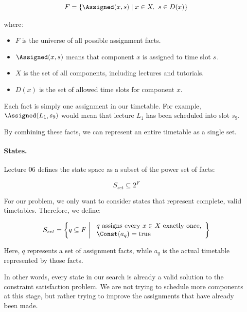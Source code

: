 \begin{equation}
    F=\{\Assigned(x,s)\mid x\in X,\ s\in D(x)\}
\end{equation}

where:
\begin{itemize}
    \item $F$ is the universe of all possible assignment facts.
    \item $\Assigned(x,s)$ means that component $x$ is assigned to time slot $s$.
    \item $X$ is the set of all components, including lectures and tutorials.
    \item $D(x)$ is the set of allowed time slots for component $x$.
\end{itemize}

Each fact is simply one assignment in our timetable. For example, $\Assigned(L_1,s_9)$ would mean that lecture $L_1$ has been scheduled into slot $s_9$.

By combining these facts, we can represent an entire timetable as a single set.

\paragraph{States.}

Lecture 06 defines the state space as a subset of the power set of facts:

\begin{equation}
    S_{set}\subseteq 2^F
\end{equation}

For our problem, we only want to consider states that represent complete, valid timetables. Therefore, we define:

\begin{equation}
    S_{set}=
    \left\{
    q\subseteq F\ \middle|\
    \begin{array}{l}
    q\text{ assigns every }x\in X\text{ exactly once,}\\
    \Const(a_q)=\mathrm{true}
    \end{array}
    \right\}
\end{equation}

Here, $q$ represents a set of assignment facts, while $a_q$ is the actual timetable represented by those facts.

In other words, every state in our search is already a valid solution to the constraint satisfaction problem. We are not trying to schedule more components at this stage, but rather trying to improve the assignments that have already been made.

